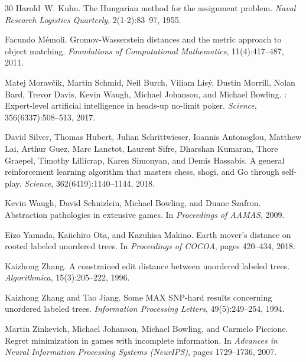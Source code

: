 \documentclass[11pt]{article}
\begin{document}
\begin{thebibliography}{30}
Harold~W. Kuhn.
\newblock The {Hungarian} method for the assignment problem.
\newblock \emph{Naval Research Logistics Quarterly}, 2(1-2):83--97, 1955.

Facundo M{\'e}moli.
\newblock Gromov-{Wasserstein} distances and the metric approach to object
  matching.
\newblock \emph{Foundations of Computational Mathematics}, 11(4):417--487, 2011.

Matej Morav{\v{c}}{\'i}k, Martin Schmid, Neil Burch, Viliam Lis{\'y}, Dustin
  Morrill, Nolan Bard, Trevor Davis, Kevin Waugh, Michael Johanson, and Michael
  Bowling.
: Expert-level artificial intelligence in heads-up no-limit
  poker.
\newblock \emph{Science}, 356(6337):508--513, 2017.

David Silver, Thomas Hubert, Julian Schrittwieser, Ioannis Antonoglou, Matthew
  Lai, Arthur Guez, Marc Lanctot, Laurent Sifre, Dharshan Kumaran, Thore
  Graepel, Timothy Lillicrap, Karen Simonyan, and Demis Hassabis.
\newblock A general reinforcement learning algorithm that masters chess, shogi,
  and {Go} through self-play.
\newblock \emph{Science}, 362(6419):1140--1144, 2018.

Kevin Waugh, David Schnizlein, Michael Bowling, and Duane Szafron.
\newblock Abstraction pathologies in extensive games.
\newblock In \emph{Proceedings of AAMAS}, 2009.

Eizo Yamada, Kaiichiro Ota, and Kazuhisa Makino.
\newblock Earth mover's distance on rooted labeled unordered trees.
\newblock In \emph{Proceedings of COCOA}, pages 420--434, 2018.

Kaizhong Zhang.
\newblock A constrained edit distance between unordered labeled trees.
\newblock \emph{Algorithmica}, 15(3):205--222, 1996.

Kaizhong Zhang and Tao Jiang.
\newblock Some {MAX SNP}-hard results concerning unordered labeled trees.
\newblock \emph{Information Processing Letters}, 49(5):249--254, 1994.

Martin Zinkevich, Michael Johanson, Michael Bowling, and Carmelo Piccione.
\newblock Regret minimization in games with incomplete information.
\newblock In \emph{Advances in Neural Information Processing Systems (NeurIPS)},
  pages 1729--1736, 2007.

\end{thebibliography}
\end{document}
